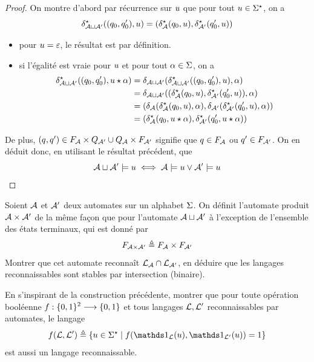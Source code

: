 \begin{proof}
  On montre d'abord par récurrence sur $u$ que pour tout
  $u \in \Sigma^{\star}$, on a
  \[\delta_{\mathcal{A}\mathbin{\sqcup}\mathcal{A}'}^{\star}((q_{0},q_{0}'),u) =
  (\delta_{\mathcal{A}}^{\star}(q_{0},u),\delta_{\mathcal{A}'}^{\star}(q_{0}',u))\]
  \begin{itemize}
  \item pour $u = \varepsilon$, le résultat est par définition.
  \item si l'égalité est vraie pour $u$ et pour tout $\alpha \in \Sigma$, on
    a
    \begin{align*}
      \delta_{\mathcal{A}\mathbin{\sqcup}\mathcal{A}'}^{\star}((q_{0},q_{0}'),u\mathbin{\star}\alpha) &=
      \delta_{\mathcal{A}\mathbin{\sqcup}\mathcal{A}'}(\delta_{\mathcal{A}\mathbin{\sqcup}\mathcal{A}'}^{\star}((q_{0},q_{0}'),u),\alpha)\\
      &= \delta_{\mathcal{A}\mathbin{\sqcup}\mathcal{A}'}((\delta_{\mathcal{A}}^{\star}(q_{0},u),\delta_{\mathcal{A}'}^{\star}(q_{0}',u)),\alpha)\\
      &= (\delta_{\mathcal{A}}(\delta_{\mathcal{A}}^{\star}(q_{0},u),\alpha),
      \delta_{\mathcal{A}'}(\delta_{\mathcal{A}'}^{\star}(q_{0}',u),\alpha))\\
      &= (\delta_{\mathcal{A}}^{\star}(q_{0},u\mathbin{\star}\alpha),\delta_{\mathcal{A}'}^{\star}(q_{0}',u\mathbin{\star}\alpha))
    \end{align*}
  \end{itemize}

  De plus, $(q_{},q_{}') \in F_{\mathcal{A}}\times Q_{\mathcal{A}'} \cup Q_{\mathcal{A}}\times F_{\mathcal{A}'}$
  signifie que $q_{} \in F_{\mathcal{A}}$ ou $q_{}' \in F_{\mathcal{A}'}$. On en déduit donc,
  en utilisant le résultat précédent, que
  \[\mathcal{A}\mathbin{\sqcup}\mathcal{A}'\models u \iff
  \mathcal{A} \models u \lor \mathcal{A}'\models u\qedhere\]
\end{proof}

\begin{exercise}
  Soient $\mathcal{A}$ et $\mathcal{A}'$ deux automates sur un alphabet $\Sigma$. On
  définit l'automate produit $\mathcal{A} \times \mathcal{A}'$ de la même façon que
  pour l'automate $\mathcal{A}\mathbin{\sqcup}\mathcal{A}'$ à l'exception de l'ensemble des états terminaux,
  qui est donné par
  \[F_{\mathcal{A}\times\mathcal{A}'} \triangleq F_{\mathcal{A}} \times F_{\mathcal{A}'}\]
  Montrer que cet automate reconnaît $\mathcal L_{\mathcal{A}} \cap \mathcal L_{\mathcal{A}'}$, en
  déduire que les langages reconnaissables sont stables par intersection
  (binaire).

  En s'inspirant de la construction précédente, montrer que pour toute opération
  booléenne $f : \displaystyle \{0,1\}^2 \longrightarrow \{0,1\}$ et tous langages $\mathcal L,\mathcal L'$
  reconnaissables par automates, le langage
  \[f(\varLL,\varLL') \defeq
  \compr{\varwd \in \toStA}
        {f(\indicP{\varLL}(\varwd),\indicP{\varLL'}(\varwd)) = 1}\]
  est aussi un langage reconnaissable.
\end{exercise}

